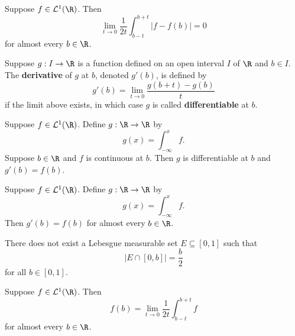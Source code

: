 \begin{theorem}
    Suppose \( f \in \mathcal{L}^{1}(\R) \). Then
    \[  \lim_{ t \to 0 }  \frac{ 1 }{ 2t }  \int_{ b-t }^{ b + t }  | f - f(b) |   = 0  \]
    for almost every \( b \in \R  \).
\end{theorem}

\begin{definition}[Derivative]
    Suppose \( g : I \to \R  \) is a function defined on an open interval \( I  \) of \( \R  \) and \( b \in I \). The \textbf{derivative} of \( g  \) at \( b  \), denoted \( g'(b) \), is defined by
    \[  g'(b) = \lim_{ t \to 0 }  \frac{ g(b+t) - g(b) }{ t  }  \]
    if the limit above exists, in which case \( g  \) is called \textbf{differentiable} at \( b \).
\end{definition}

\begin{theorem}
    Suppose \( f \in \mathcal{L}^{1}(\R) \). Define \( g : \R \to \R  \) by 
    \[  g(x) = \int_{ - \infty  }^{ x  } f. \]
    Suppose \( b \in \R  \) and \( f  \) is continuous at \( b  \). Then \( g  \) is differentiable at \( b  \) and \( g'(b) = f(b) \).
\end{theorem}

\begin{theorem}
    Suppose \( f \in \mathcal{L}^{1}(\R) \). Define \( g : \R \to \R  \) by
    \[  g(x) = \int_{ -\infty  }^{ x  }  f. \]
    Then \( g'(b) = f(b) \) for almost every \( b \in \R  \).
\end{theorem}

\begin{prop}
    There does not exist a Lebesgue measurable set \( E \subseteq [0,1]  \) such that 
    \[  | E \cap [0,b] |  = \frac{ b }{ 2 } \]
    for all \( b \in [0,1] \).
\end{prop}

\begin{prop}
   Suppose \( f \in \mathcal{L}^{1}(\R)  \). Then  
   \[  f(b) = \lim_{ t  \to 0  }  \frac{ 1 }{ 2t }  \int_{ b - t  }^{  b + t  }  f   \]
   for almost every \( b \in \R  \).
\end{prop} 

